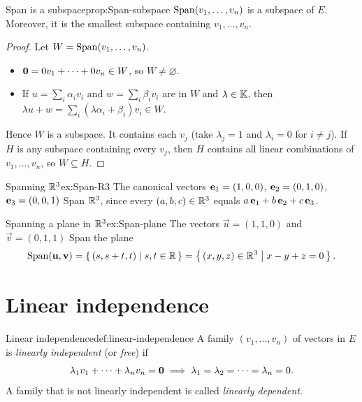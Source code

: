 \begin{proposition}{Span is a subspace}{prop:Span-subspace}
$\operatorname{Span}(v_1,\ldots,v_n)$ is a subspace of $E$. Moreover, it is the
smallest subspace containing $v_1,\ldots,v_n$.
\end{proposition}

\begin{proof}
Let $W = \operatorname{Span}(v_1,\ldots,v_n)$.
\begin{itemize}
  \item $\mathbf{0} = 0v_1+\cdots+0v_n\in W$, so $W\neq\varnothing$.
  \item If $u = \sum_i \alpha_i v_i$ and $w = \sum_i\beta_i v_i$ are in
    $W$ and $\lambda\in{\mathbb{K}}$, then
    $\lambda u + w = \sum_i(\lambda\alpha_i+\beta_i)v_i\in W$.
\end{itemize}
Hence $W$ is a subspace. It contains each $v_j$ (take
$\lambda_j=1$ and $\lambda_i=0$ for $i\neq j$). If $H$ is any subspace
containing every $v_j$, then $H$ contains all linear combinations of
$v_1,\ldots,v_n$, so $W\subseteq H$.
\end{proof}

\begin{example}{Spanning ${\mathbb{R}}^3$}{ex:Span-R3}
The canonical vectors $\mathbf{e}_{1}=(1,0,0)$, $\mathbf{e}_{2}=(0,1,0)$,
$\mathbf{e}_{3}=(0,0,1)$ Span ${\mathbb{R}}^3$, since every $(a,b,c)\in{\mathbb{R}}^3$ equals
$a\,\mathbf{e}_{1}+b\,\mathbf{e}_{2}+c\,\mathbf{e}_{3}$.
\end{example}

\begin{example}{Spanning a plane in ${\mathbb{R}}^3$}{ex:Span-plane}
The vectors $\vec{u}=(1,1,0)$ and $\vec{v}=(0,1,1)$ Span the plane
\[
  \operatorname{Span}(\mathbf{u},\mathbf{v}) = \left\{\,(s,s+t,t)\;\middle|\;s,t\in{\mathbb{R}}\,\right\}
  = \left\{\,(x,y,z)\in{\mathbb{R}}^3\;\middle|\;x-y+z=0\,\right\}.
\]
\end{example}


\section{Linear independence}\label{sec:linear-independence}

\begin{definition}{Linear independence}{def:linear-independence}
A family $(v_1,\ldots,v_n)$ of vectors in $E$ is \emph{linearly
independent} (or \emph{free}) if
\[
  \lambda_1 v_1 + \cdots + \lambda_n v_n = \mathbf{0}
  \implies
  \lambda_1 = \lambda_2 = \cdots = \lambda_n = 0.
\]
A family that is not linearly independent is called \emph{linearly
dependent}.
\end{definition}

